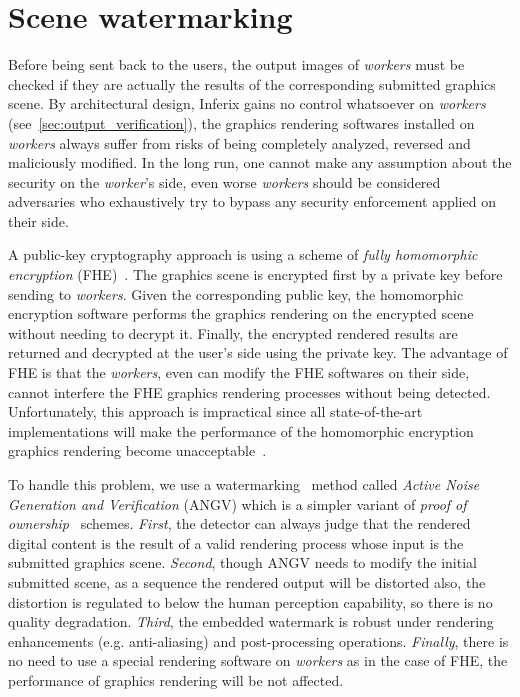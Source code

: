 \chapter{Scene watermarking}
\label{ch:scene_watermarking}

Before being sent back to the users, the output images of \emph{workers} must be checked if they are actually the results of the corresponding submitted graphics scene. By architectural design, Inferix gains no control whatsoever on \emph{workers} (see~\ref{sec:output_verification}), the graphics rendering softwares installed on \emph{workers} always suffer from risks of being completely analyzed, reversed and maliciously modified. In the long run, one cannot make any assumption about the security on the \emph{worker}'s side, even worse \emph{workers} should be considered adversaries who exhaustively try to bypass any security enforcement applied on their side.

A public-key cryptography approach is using a scheme of \emph{fully homomorphic encryption} (FHE)~\cite{Gentry2009}. The graphics scene is encrypted first by a private key before sending to \emph{workers}. Given the corresponding public key, the homomorphic encryption software performs the graphics rendering on the encrypted scene without needing to decrypt it. Finally, the encrypted rendered results are returned and decrypted at the user's side using the private key. The advantage of FHE is that the \emph{workers}, even can modify the FHE softwares on their side, cannot interfere the FHE graphics rendering processes without being detected. Unfortunately, this approach is impractical since all state-of-the-art implementations will make the performance of the homomorphic encryption graphics rendering become unacceptable~\cite{9910347}.

To handle this problem, we use a watermarking~\cite{Cox1997,Cox1999} method called \emph{Active Noise Generation and Verification} (ANGV) which is a simpler variant of \emph{proof of ownership}~\cite{Craver1997} schemes. \emph{First}, the detector can always judge that the rendered digital content is the result of a valid rendering process whose input is the submitted graphics scene. \emph{Second}, though ANGV needs to modify the initial submitted scene, as a sequence the rendered output will be distorted also, the distortion is regulated to below the human perception capability, so there is no quality degradation. \emph{Third}, the embedded watermark is robust under rendering enhancements (e.g. anti-aliasing) and post-processing operations. \emph{Finally}, there is no need to use a special rendering software on \emph{workers} as in the case of FHE, the performance of graphics rendering will be not affected.

